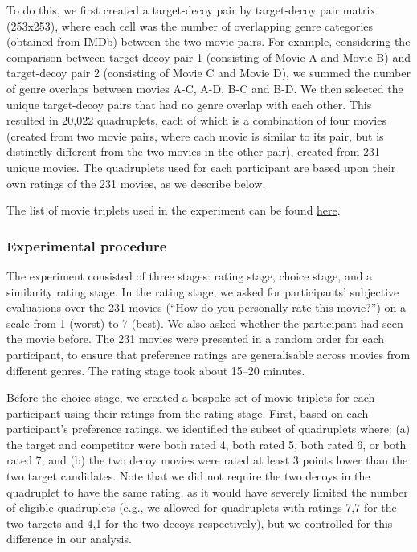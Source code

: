 \documentclass[12pt, a4paper]{article}
\begin{document}
To do this, we first created a target-decoy pair by target-decoy pair matrix (253x253), where each cell was the number of overlapping genre categories (obtained from IMDb) between the two movie pairs. For example, considering the comparison between target-decoy pair 1 (consisting of Movie A and Movie B) and target-decoy pair 2 (consisting of Movie C and Movie D), we summed the number of genre overlaps between movies A-C, A-D, B-C and B-D. We then selected the unique target-decoy pairs that had no genre overlap with each other. This resulted in 20,022 quadruplets, each of which is a combination of four movies (created from two movie pairs, where each movie is similar to its pair, but is distinctly different from the two movies in the other pair), created from 231 unique movies. The quadruplets used for each participant are based upon their own ratings of the 231 movies, as we describe below.


The list of movie triplets used in the experiment can be found \href{https://osf.io/fme6c/?view_only=31da4193689f4247a76af93b2f98fcef}{here}.

\subsubsection*{Experimental procedure}

The experiment consisted of three stages: rating stage, choice stage, and a similarity rating stage. In the rating stage, we asked for participants' subjective evaluations over the 231 movies (``How do you personally rate this movie?'') on a scale from 1 (worst) to 7 (best). We also asked whether the participant had seen the movie before. The 231 movies were presented in a random order for each participant, to ensure that preference ratings are generalisable across movies from different genres. The rating stage took about 15--20 minutes.

Before the choice stage, we created a bespoke set of movie triplets for each participant using their ratings from the rating stage. First, based on each participant's preference ratings, we identified the subset of quadruplets where: (a) the target and competitor were both rated 4, both rated 5, both rated 6, or both rated 7, and (b) the two decoy movies were rated at least 3 points lower than the two target candidates. Note that we did not require the two decoys in the quadruplet to have the same rating, as it would have severely limited the number of eligible quadruplets (e.g., we allowed for quadruplets with ratings 7,7 for the two targets and 4,1 for the two decoys respectively), but we controlled for this difference in our analysis.
\end{document}
